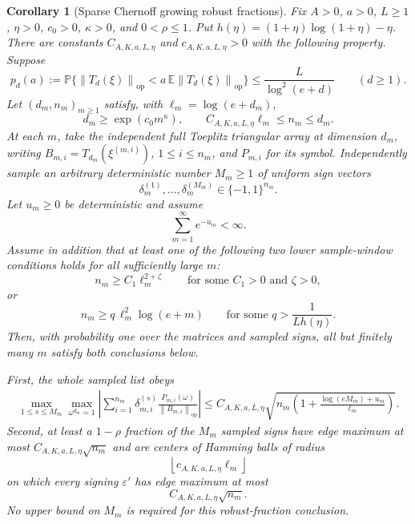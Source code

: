 \documentclass[11pt]{amsart}
\numberwithin{equation}{section}
\newtheorem{corollary}[theorem]{Corollary}
\theoremstyle{definition}
\theoremstyle{remark}
\newcommand{\op}{\mathrm{op}}
\newcommand{\Prob}{\mathbb P}
\newcommand{\Exp}{\mathbb E}
\newcommand{\norm}[1]{\left\lVert #1\right\rVert}
\newcommand{\eps}{\varepsilon}
\begin{document}
\begin{corollary}[Sparse Chernoff growing robust fractions]
\label{cor:normalizer-tail-chernoff-borel-window-growing-fractions}
Fix \(A>0\), \(a>0\), \(L\ge1\), \(\eta>0\), \(c_0>0\), \(\kappa>0\), and
\(0<\rho\le1\).  Put \(h(\eta)=(1+\eta)\log(1+\eta)-\eta\).  There are
constants \(C_{A,K,a,L,\eta}\) and \(c_{A,K,a,L,\eta}>0\) with the following
property.  Suppose
\[
  p_d(a):=\Prob\{\norm{T_d(\xi)}_{\op}
      <a\,\Exp\norm{T_d(\xi)}_{\op}\}
  \le \frac{L}{\log^2(e+d)}
  \qquad(d\ge1).
\]
Let \((d_m,n_m)_{m\ge1}\) satisfy, with \(\ell_m=\log(e+d_m)\),
\[
  d_m\ge \exp(c_0m^\kappa),\qquad
  C_{A,K,a,L,\eta}\ell_m\le n_m\le d_m .
\]
At each \(m\), take the independent full Toeplitz triangular array at dimension
\(d_m\), writing \(B_{m,i}=T_{d_m}(\xi^{(m,i)})\), \(1\le i\le n_m\), and
\(P_{m,i}\) for its symbol.  Independently sample an arbitrary deterministic
number \(M_m\ge1\) of uniform sign vectors
\[
  \delta_m^{(1)},\ldots,\delta_m^{(M_m)}\in\{-1,1\}^{n_m}.
\]
Let \(u_m\ge0\) be deterministic and assume
\[
  \sum_{m=1}^{\infty}e^{-u_m}<\infty .
\]
Assume in addition that at least one of the following two lower sample-window
conditions holds for all sufficiently large \(m\):
\[
  n_m\ge C_1\ell_m^{2+\zeta}
  \qquad\text{for some } C_1>0 \text{ and } \zeta>0,
\]
or
\[
  n_m\ge q\,\ell_m^2\log(e+m)
  \qquad\text{for some } q>\frac1{Lh(\eta)} .
\]
Then, with probability one over the matrices and sampled signs, all but
finitely many \(m\) satisfy both conclusions below.

First, the whole sampled list obeys
\[
\begin{aligned}
  \max_{1\le s\le M_m}\max_{\omega^{d_m}=1}
  \left|\sum_{i=1}^{n_m}\delta_{m,i}^{(s)}
  \frac{P_{m,i}(\omega)}{\norm{B_{m,i}}_{\op}}\right|
  \le
  C_{A,K,a,L,\eta}\sqrt{
    n_m\left(1+\frac{\log(eM_m)+u_m}{\ell_m}\right)} .
\end{aligned}
\]
Second, at least a \(1-\rho\) fraction of the \(M_m\) sampled signs have edge
maximum at most \(C_{A,K,a,L,\eta}\sqrt{n_m}\) and are centers of Hamming balls
of radius
\[
  \left\lfloor c_{A,K,a,L,\eta}\ell_m\right\rfloor
\]
on which every signing \(\eps'\) has edge maximum at most
\[
  C_{A,K,a,L,\eta}\sqrt{n_m}.
\]
No upper bound on \(M_m\) is required for this robust-fraction conclusion.
\end{corollary}
\end{document}

